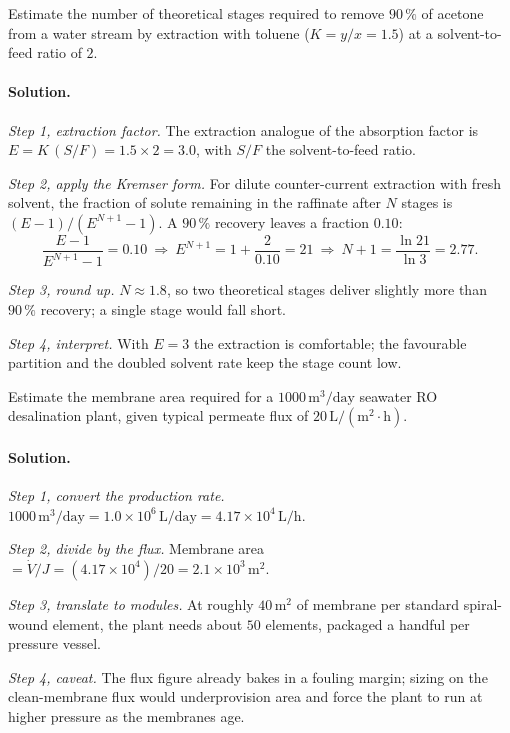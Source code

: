 \begin{exercise}
Estimate the number of theoretical stages required to remove $90\,\%$
of acetone from a water stream by extraction with toluene
($K = y/x = 1.5$) at a solvent-to-feed ratio of $2$.

\paragraph{Solution.}
\textit{Step 1, extraction factor.} The extraction analogue of the
absorption factor is $E = K\,(S/F) = 1.5\times 2 = 3.0$, with $S/F$ the
solvent-to-feed ratio.

\textit{Step 2, apply the Kremser form.} For dilute counter-current
extraction with fresh solvent, the fraction of solute remaining in the
raffinate after $N$ stages is $(E-1)/(E^{N+1}-1)$. A $90\,\%$ recovery
leaves a fraction $0.10$:
\[
\frac{E-1}{E^{N+1}-1} = 0.10 \ \Rightarrow\ E^{N+1} = 1 + \frac{2}{0.10}
= 21 \ \Rightarrow\ N+1 = \frac{\ln 21}{\ln 3} = 2.77.
\]

\textit{Step 3, round up.} $N \approx 1.8$, so two theoretical stages
deliver slightly more than $90\,\%$ recovery; a single stage would fall
short.

\textit{Step 4, interpret.} With $E = 3$ the extraction is comfortable;
the favourable partition and the doubled solvent rate keep the stage
count low.
\end{exercise}

\begin{exercise}
Estimate the membrane area required for a $1000\,\text{m}^3/\text{day}$
seawater RO desalination plant, given typical permeate flux of $20\,
\text{L}/(\text{m}^2\cdot\text{h})$.

\paragraph{Solution.}
\textit{Step 1, convert the production rate.} $1000\,\text{m}^3/
\text{day} = 1.0\times 10^{6}\,\text{L}/\text{day} = 4.17\times 10^{4}
\,\text{L/h}$.

\textit{Step 2, divide by the flux.} Membrane area $= \dot V/J =
(4.17\times 10^{4})/20 = 2.1\times 10^{3}\,\text{m}^2$.

\textit{Step 3, translate to modules.} At roughly $40\,\text{m}^2$ of
membrane per standard spiral-wound element, the plant needs about
$50$ elements, packaged a handful per pressure vessel.

\textit{Step 4, caveat.} The flux figure already bakes in a fouling
margin; sizing on the clean-membrane flux would underprovision area and
force the plant to run at higher pressure as the membranes age.
\end{exercise}

